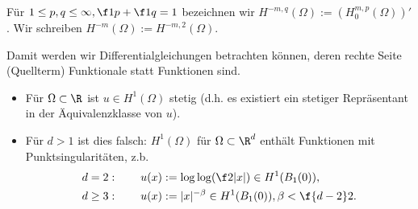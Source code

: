 \begin{df} \label{3.11}
	Für $1 \le p, q \le \infty, \f 1p + \f 1q = 1$ bezeichnen wir $H^{-m,q}(\Omega) := (H_0^{m,p}(\Omega))'$.
	Wir schreiben $H^{-m}(\Omega) := H^{-m, 2}(\Omega)$.
	\begin{note}
		Damit werden wir Differentialgleichungen betrachten können, deren rechte Seite (Quellterm) Funktionale statt Funktionen sind.
	\end{note}
\end{df}

\begin{note}[Stetigkeit für $d = 1$]
	\begin{itemize}
		\item
			Für $\Omega \subset \R$ ist $u \in H^1(\Omega)$ stetig (d.h. es existiert ein stetiger Repräsentant in der Äquivalenzklasse von $u$).
		\item
			Für $d > 1$ ist dies falsch: $H^1(\Omega)$ für $\Omega \subset \R^d$ enthält Funktionen mit Punktsingularitäten, z.b.
			\begin{align*}
				d = 2: \qquad u(x) &:= \log \log(\f 2{|x|}) \in H^1(B_1(0)), \\
				d \ge 3: \qquad u(x) &:= |x|^{-\beta} \in H^1(B_1(0)), \beta < \f{d-2}2.
			\end{align*}
	\end{itemize}
\end{note}

